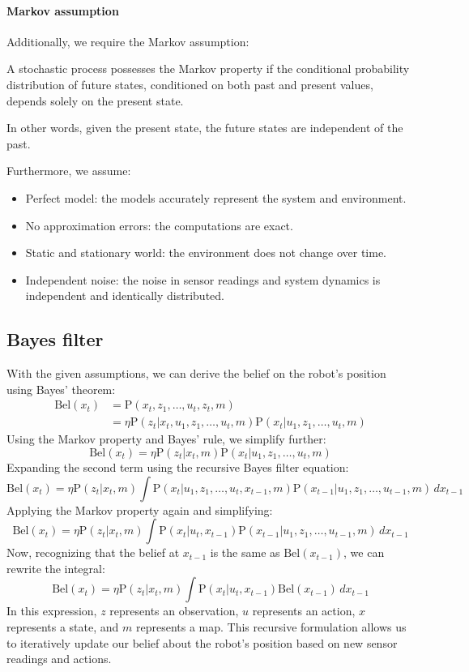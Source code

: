 \paragraph*{Markov assumption}
Additionally, we require the Markov assumption:
\begin{property}
    A stochastic process possesses the Markov property if the conditional probability distribution of future states, conditioned on both past and present values, depends solely on the present state.
\end{property}
In other words, given the present state, the future states are independent of the past.

Furthermore, we assume:
\begin{itemize}
    \item Perfect model: the models accurately represent the system and environment.
    \item No approximation errors: the computations are exact.
    \item Static and stationary world: the environment does not change over time.
    \item Independent noise: the noise in sensor readings and system dynamics is independent and identically distributed.
\end{itemize}


\subsection{Bayes filter}
With the given assumptions, we can derive the belief on the robot's position using Bayes' theorem:
\begin{align*}
    \text{Bel}(x_t) &=\text{P}(x_t,z_1,\dots,u_t,z_t,m) \\
                    &=\eta\text{P}(z_t|x_t,u_1,z_1,\dots,u_t,m)\text{P}(x_t|u_1,z_1,\dots,u_t,m) 
\end{align*}
Using the Markov property and Bayes' rule, we simplify further:
\[\text{Bel}(x_t)=\eta\text{P}(z_t|x_t,m)\text{P}(x_t|u_1,z_1,\dots,u_t,m)\]
Expanding the second term using the recursive Bayes filter equation:
\[\text{Bel}(x_t)=\eta\text{P}(z_t|x_t,m)\int\text{P}(x_t|u_1,z_1,\dots,u_t,x_{t-1},m)\text{P}(x_{t-1}|u_1,z_1,\dots,u_{t-1},m)\,dx_{t-1}\]
Applying the Markov property again and simplifying:
\[\text{Bel}(x_t)=\eta\text{P}(z_t|x_t,m)\int\text{P}(x_t|u_t,x_{t-1})\text{P}(x_{t-1}|u_1,z_1,\dots,u_{t-1},m)\,dx_{t-1}\]
Now, recognizing that the belief at $x_{t-1}$ is the same as $\text{Bel}(x_{t-1})$, we can rewrite the integral:
\[\text{Bel}(x_t)=\eta\text{P}(z_t|x_t,m)\int\text{P}(x_t|u_t,x_{t-1})\text{Bel}(x_{t-1})\,dx_{t-1}\]
In this expression, $z$ represents an observation, $u$ represents an action, $x$ represents a state, and $m$ represents a map.
This recursive formulation allows us to iteratively update our belief about the robot's position based on new sensor readings and actions.

